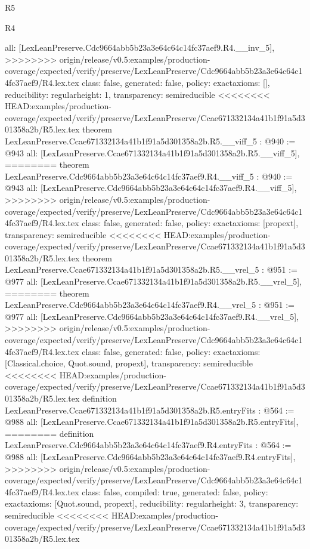 \begin{lexlean}{R5}
\begin{lexlean}{R4}
\begin{coremodule}
{{{{{{{{{{{{  all: [LexLeanPreserve.Cdc9664abb5b23a3e64c64c14fc37aef9.R4.__inv_5],
>>>>>>>> origin/release/v0.5:examples/production-coverage/expected/verify/preserve/LexLeanPreserve/Cdc9664abb5b23a3e64c64c14fc37aef9/R4.lex.tex
  class: false,
  generated: false,
  policy: exact{axioms: []},
  reducibility: regular{height: 1},
  transparency: semireducible
}
<<<<<<<< HEAD:examples/production-coverage/expected/verify/preserve/LexLeanPreserve/Ccae671332134a41b1f91a5d301358a2b/R5.lex.tex
theorem LexLeanPreserve.Ccae671332134a41b1f91a5d301358a2b.R5.__viff_5 : @940 := @943 {
  all: [LexLeanPreserve.Ccae671332134a41b1f91a5d301358a2b.R5.__viff_5],
========
theorem LexLeanPreserve.Cdc9664abb5b23a3e64c64c14fc37aef9.R4.__viff_5 : @940 := @943 {
  all: [LexLeanPreserve.Cdc9664abb5b23a3e64c64c14fc37aef9.R4.__viff_5],
>>>>>>>> origin/release/v0.5:examples/production-coverage/expected/verify/preserve/LexLeanPreserve/Cdc9664abb5b23a3e64c64c14fc37aef9/R4.lex.tex
  class: false,
  generated: false,
  policy: exact{axioms: [propext]},
  transparency: semireducible
}
<<<<<<<< HEAD:examples/production-coverage/expected/verify/preserve/LexLeanPreserve/Ccae671332134a41b1f91a5d301358a2b/R5.lex.tex
theorem LexLeanPreserve.Ccae671332134a41b1f91a5d301358a2b.R5.__vrel_5 : @951 := @977 {
  all: [LexLeanPreserve.Ccae671332134a41b1f91a5d301358a2b.R5.__vrel_5],
========
theorem LexLeanPreserve.Cdc9664abb5b23a3e64c64c14fc37aef9.R4.__vrel_5 : @951 := @977 {
  all: [LexLeanPreserve.Cdc9664abb5b23a3e64c64c14fc37aef9.R4.__vrel_5],
>>>>>>>> origin/release/v0.5:examples/production-coverage/expected/verify/preserve/LexLeanPreserve/Cdc9664abb5b23a3e64c64c14fc37aef9/R4.lex.tex
  class: false,
  generated: false,
  policy: exact{axioms: [Classical.choice, Quot.sound, propext]},
  transparency: semireducible
}
<<<<<<<< HEAD:examples/production-coverage/expected/verify/preserve/LexLeanPreserve/Ccae671332134a41b1f91a5d301358a2b/R5.lex.tex
definition LexLeanPreserve.Ccae671332134a41b1f91a5d301358a2b.R5.entryFits : @564 := @988 {
  all: [LexLeanPreserve.Ccae671332134a41b1f91a5d301358a2b.R5.entryFits],
========
definition LexLeanPreserve.Cdc9664abb5b23a3e64c64c14fc37aef9.R4.entryFits : @564 := @988 {
  all: [LexLeanPreserve.Cdc9664abb5b23a3e64c64c14fc37aef9.R4.entryFits],
>>>>>>>> origin/release/v0.5:examples/production-coverage/expected/verify/preserve/LexLeanPreserve/Cdc9664abb5b23a3e64c64c14fc37aef9/R4.lex.tex
  class: false,
  compiled: true,
  generated: false,
  policy: exact{axioms: [Quot.sound, propext]},
  reducibility: regular{height: 3},
  transparency: semireducible
}
<<<<<<<< HEAD:examples/production-coverage/expected/verify/preserve/LexLeanPreserve/Ccae671332134a41b1f91a5d301358a2b/R5.lex.tex
}}}}}}}}}}}}}}
\end{coremodule}
\end{lexlean}
\end{lexlean}
